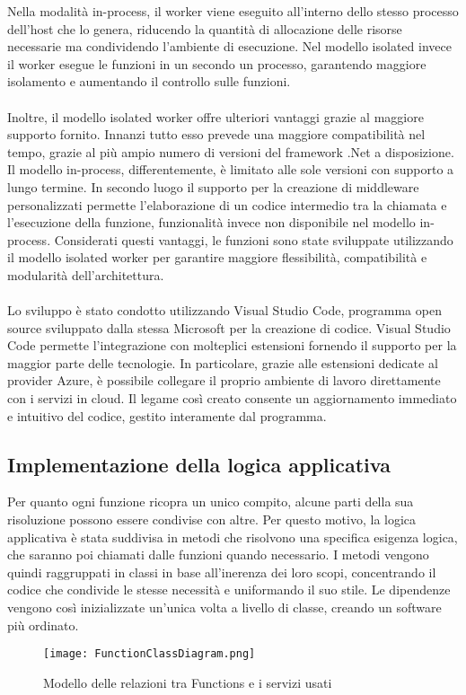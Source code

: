 Nella modalità in-process,
il worker viene eseguito all'interno dello stesso processo 
dell'host che lo genera,
riducendo la quantità di allocazione delle risorse necessarie
ma condividendo l'ambiente di esecuzione.
Nel modello isolated invece
il worker esegue le funzioni in un secondo un processo,
garantendo maggiore isolamento e aumentando il controllo sulle funzioni.\\
\\
Inoltre, il modello isolated worker offre ulteriori vantaggi
grazie al maggiore supporto fornito.
Innanzi tutto esso prevede una maggiore compatibilità nel tempo,
grazie al più ampio numero di versioni del framework .Net a disposizione.
Il modello in-process, differentemente, 
è limitato alle sole versioni con supporto a lungo termine.
In secondo luogo il supporto per la creazione di middleware personalizzati
permette l'elaborazione di un codice intermedio 
tra la chiamata e l'esecuzione della funzione,
funzionalità invece non disponibile nel modello in-process.
Considerati questi vantaggi, 
le funzioni sono state sviluppate utilizzando il modello isolated worker
per garantire maggiore flessibilità, 
compatibilità e modularità dell'architettura.\\
\\
Lo sviluppo è stato condotto utilizzando Visual Studio Code,
programma open source sviluppato dalla stessa Microsoft per la creazione di codice.
Visual Studio Code permette l'integrazione con molteplici estensioni 
fornendo il supporto per la maggior parte delle tecnologie.
In particolare, grazie alle estensioni dedicate al provider Azure,
è possibile collegare il proprio ambiente di lavoro direttamente con i servizi in cloud.
Il legame così creato consente un aggiornamento immediato e intuitivo del codice,
gestito interamente dal programma.
\clearpage


\subsection{Implementazione della logica applicativa}
Per quanto ogni funzione ricopra un unico compito,
alcune parti della sua risoluzione possono essere condivise con altre.
Per questo motivo,
la logica applicativa è stata suddivisa 
in metodi che risolvono una specifica esigenza logica,
che saranno poi chiamati dalle funzioni quando necessario.
I metodi vengono quindi raggruppati in classi in base all'inerenza dei loro scopi,
concentrando il codice che condivide le stesse necessità e uniformando il suo stile.
Le dipendenze vengono così inizializzate un'unica volta a livello di classe,
creando un software più ordinato.\\
\begin{figure}[h!]
    \begin{center}
        \texttt{[image: FunctionClassDiagram.png]}
        \caption{Modello delle relazioni tra Functions e i servizi usati}
    \end{center}
\end{figure}

